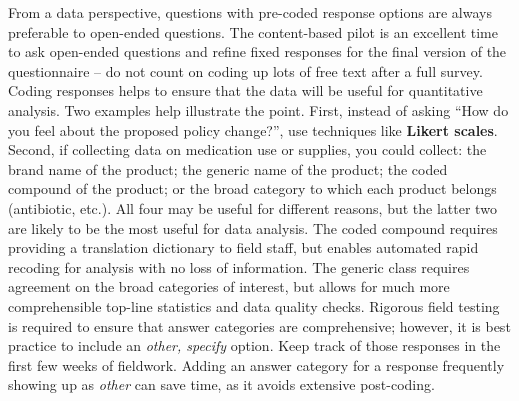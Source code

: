 From a data perspective, questions with pre-coded response options
are always preferable to open-ended questions.
The content-based pilot is an excellent time to ask open-ended questions
and refine fixed responses for the final version of the questionnaire --
do not count on coding up lots of free text after a full survey.
Coding responses helps to ensure that the data will be useful for quantitative analysis.
Two examples help illustrate the point.
First, instead of asking ``How do you feel about the proposed policy change?'',
use techniques like \textbf{Likert scales}.
Second, if collecting data on medication use or supplies, you could collect:
the brand name of the product; the generic name of the product; the coded compound of the product;
or the broad category to which each product belongs (antibiotic, etc.).
All four may be useful for different reasons,
but the latter two are likely to be the most useful for data analysis.
The coded compound requires providing a translation dictionary to field staff,
but enables automated rapid recoding for analysis with no loss of information.
The generic class requires agreement on the broad categories of interest,
but allows for much more comprehensible top-line statistics and data quality checks.
Rigorous field testing is required to ensure that answer categories are comprehensive;
however, it is best practice to include an \textit{other, specify} option.
Keep track of those responses in the first few weeks of fieldwork.
Adding an answer category for a response frequently showing up as \textit{other} can save time,
as it avoids extensive post-coding.

